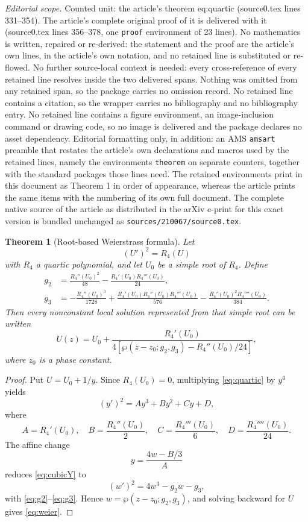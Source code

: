 \documentclass[10pt,a4paper]{amsart}
\newtheorem{theorem}{Theorem}
\newcommand{\wpF}{\wp}
\begin{document}
\noindent\textit{Editorial scope.} Counted unit: the article's theorem eq:quartic (source0.tex lines 331--354). The article's complete original proof of it is delivered with it (source0.tex lines 356--378, one \texttt{proof} environment of 23 lines). No mathematics is written, repaired or re-derived: the statement and the proof are the article's own lines, in the article's own notation, and no retained line is substituted or re-flowed.  No further source-local context is needed: every cross-reference of every retained line resolves inside the two delivered spans.  Nothing was omitted from any retained span, so the package carries no omission record.  No retained line contains a citation, so the wrapper carries no bibliography and no bibliography entry.  No retained line contains a figure environment, an image-inclusion command or drawing code, so no image is delivered and the package declares no asset dependency.  Editorial formatting only, in addition: an AMS \texttt{amsart} preamble that restates the article's own declarations and macros used by the retained lines, namely the environments \texttt{theorem} on separate counters, together with the standard packages those lines need.  The retained environments print in this document as Theorem 1 in order of appearance, whereas the article prints the same items with the numbering of its own full document.  The complete native source of the article as distributed in the arXiv e-print for this exact version is bundled unchanged as \texttt{sources/210067/source0.tex}.
\begin{theorem}[Root-based Weierstrass formula]
Let
\begin{equation}
 (U')^2=R_4(U)
 \label{eq:quartic}
\end{equation}
with $R_4$ a quartic polynomial, and let $U_0$ be a simple root of $R_4$.  Define
\begin{align}
 g_2&=\frac{R_4''(U_0)^2}{48}
      -\frac{R_4'(U_0)R_4'''(U_0)}{24},
 \label{eq:g2}\\
 g_3&=-\frac{R_4''(U_0)^3}{1728}
      +\frac{R_4'(U_0)R_4''(U_0)R_4'''(U_0)}{576}
      -\frac{R_4'(U_0)^2R_4''''(U_0)}{384}.
 \label{eq:g3}
\end{align}
Then every nonconstant local solution represented from that simple root can be written
\begin{equation}
 U(z)=U_0+
 \frac{R_4'(U_0)}{4\left[\wpF(z-z_0;g_2,g_3)-R_4''(U_0)/24\right]},
 \label{eq:weier}
\end{equation}
where $z_0$ is a phase constant.
\end{theorem}

\begin{proof}
Put $U=U_0+1/y$.  Since $R_4(U_0)=0$, multiplying \eqref{eq:quartic} by $y^4$ yields
\begin{equation}
 (y')^2=Ay^3+By^2+Cy+D,
 \label{eq:cubicY}
\end{equation}
where
\[
 A=R_4'(U_0),\quad
 B=\frac{R_4''(U_0)}{2},\quad
 C=\frac{R_4'''(U_0)}{6},\quad
 D=\frac{R_4''''(U_0)}{24}.
\]
The affine change
\[
 y=\frac{4w-B/3}{A}
\]
reduces \eqref{eq:cubicY} to
\[
 (w')^2=4w^3-g_2w-g_3,
\]
with \eqref{eq:g2}--\eqref{eq:g3}.  Hence $w=\wpF(z-z_0;g_2,g_3)$, and solving backward for $U$ gives \eqref{eq:weier}.
\end{proof}
\end{document}
